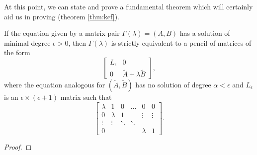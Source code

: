 At this point, we can state and prove a fundamental theorem which will certainly aid us
in proving  (theorem \ref{thm:kcf}).

\begin{theorem}
    If the equation given by a matrix pair \(\Gamma(\lambda) = (A, B)\) has a solution of minimal
    degree \(\epsilon > 0\), then \(\Gamma(\lambda)\) is strictly equivalent to a pencil of matrices of the form
    \[
        \begin{bmatrix}
            L_{\epsilon} & 0 \\
            0 & \tilde{A} + \lambda \tilde{B}
        \end{bmatrix},
    \]
    where the equation analogous for \((\tilde{A}, \tilde{B})\) has no solution of degree \(\alpha < \epsilon\) and
    \(L_{\epsilon}\) is an \(\epsilon \times (\epsilon + 1)\) matrix such that
    \[
        \begin{bmatrix}
            \lambda & 1       & 0     & \hdots & 0       &    0   \\
            0       & \lambda & 1     &        & \vdots  & \vdots \\
            \vdots  & \vdots & \ddots & \ddots \\
            0       &        &        &        & \lambda & 1
        \end{bmatrix}.
    \]
\end{theorem}

\begin{proof}
    
\end{proof}